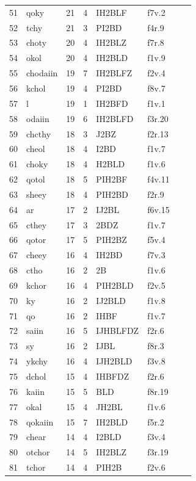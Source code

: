 \documentclass[11pt,a4paper]{article}
\begin{document}
\begin{landscape}
\begin{longtable}{@{}r>{\ttfamily}lrrl>{\ttfamily}l>{\raggedright\arraybackslash}p{80mm}>{\raggedright\arraybackslash}p{36mm}@{}}
51 & qoky & 21 & 4 & IH2BLF & f7v.2 &  & \\
52 & tchy & 21 & 3 & PI2BD & f4r.9 &  & \\
53 & choty & 20 & 4 & IH2BLZ & f7r.8 &  & \\
54 & okol & 20 & 4 & IH2BLD & f1v.9 &  & \\
55 & chodaiin & 19 & 7 & IH2BLFZ & f2v.4 &  & \\
56 & kchol & 19 & 4 & PI2BD & f8v.7 &  & \\
57 & l & 19 & 1 & IH2BFD & f1v.1 &  & \\
58 & odaiin & 19 & 6 & IH2BLFD & f3r.20 &  & \\
59 & chcthy & 18 & 3 & J2BZ & f2r.13 &  & \\
60 & cheol & 18 & 4 & I2BD & f1v.7 &  & \\
61 & choky & 18 & 4 & H2BLD & f1v.6 &  & \\
62 & qotol & 18 & 5 & PIH2BF & f4v.11 &  & \\
63 & sheey & 18 & 4 & PIH2BD & f2r.9 &  & \\
64 & ar & 17 & 2 & IJ2BL & f6v.15 &  & \\
65 & cthey & 17 & 3 & 2BDZ & f1v.7 &  & \\
66 & qotor & 17 & 5 & PIH2BZ & f5v.4 &  & \\
67 & cheey & 16 & 4 & IH2BD & f7v.3 &  & \\
68 & ctho & 16 & 2 & 2B & f1v.6 &  & \\
69 & kchor & 16 & 4 & PIH2BLD & f2v.5 &  & \\
70 & ky & 16 & 2 & IJ2BLD & f1v.8 &  & \\
71 & qo & 16 & 2 & IHBF & f1v.7 &  & \\
72 & saiin & 16 & 5 & IJHBLFDZ & f2r.6 &  & \\
73 & sy & 16 & 2 & IJBL & f8r.3 &  & \\
74 & ykchy & 16 & 4 & IJH2BLD & f3v.8 &  & \\
75 & dchol & 15 & 4 & IHBFDZ & f2r.6 &  & \\
76 & kaiin & 15 & 5 & BLD & f8r.19 &  & \\
77 & okal & 15 & 4 & JH2BL & f1v.6 &  & \\
78 & qokaiin & 15 & 7 & IH2BLD & f5r.2 &  & \\
79 & chear & 14 & 4 & I2BLD & f3v.4 &  & \\
80 & otchor & 14 & 5 & IH2BLZ & f3r.19 &  & \\
81 & tchor & 14 & 4 & PIH2B & f2v.6 &  & \\

\end{longtable}
\end{landscape}
\end{document}

